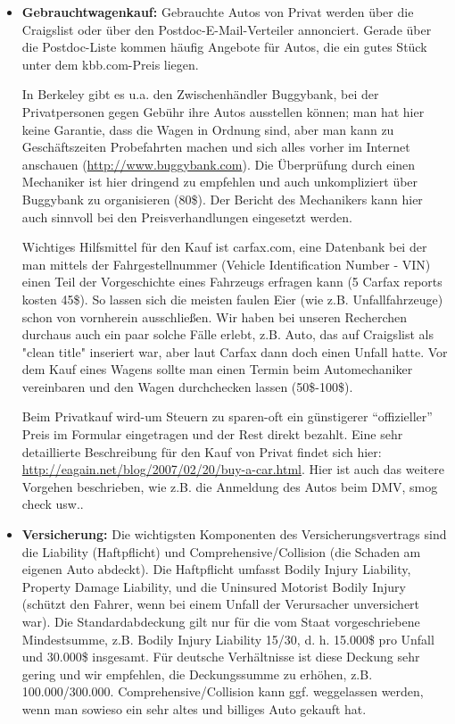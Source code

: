 \documentclass[a4paper]{scrreprt}
\begin{document}
\begin{itemize}

\item \textbf{Gebrauchtwagenkauf:} Gebrauchte Autos von Privat werden über die Craigslist oder über den Postdoc-E-Mail-Verteiler annonciert. 
Gerade über die Postdoc-Liste kommen häufig Angebote für Autos, die ein gutes Stück unter dem kbb.com-Preis liegen.

In Berkeley gibt es u.a. den Zwischenhändler Buggybank, bei der Privatpersonen gegen Gebühr ihre Autos ausstellen können; man hat hier keine Garantie, dass die Wagen in Ordnung sind, aber man kann zu Geschäftszeiten Probefahrten machen und sich alles vorher im Internet anschauen (\url{http://www.buggybank.com}). Die Überprüfung durch einen Mechaniker ist hier dringend zu empfehlen und auch unkompliziert über Buggybank zu organisieren (80\$). Der Bericht des Mechanikers kann hier auch sinnvoll bei den Preisverhandlungen eingesetzt werden.
	
Wichtiges Hilfsmittel für den Kauf ist carfax.com, eine Datenbank bei der man mittels der Fahrgestellnummer (Vehicle Identification Number - VIN) einen Teil der Vorgeschichte eines Fahrzeugs erfragen kann (5 Carfax reports kosten 45\$). So lassen sich die meisten faulen Eier (wie z.B. Unfallfahrzeuge) schon von vornherein ausschließen. Wir haben bei unseren Recherchen durchaus auch ein paar solche Fälle erlebt, z.B. Auto, das auf Craigslist als "clean title" inseriert war, aber laut Carfax dann doch einen Unfall hatte. Vor dem Kauf eines Wagens sollte man einen Termin beim Automechaniker vereinbaren und den Wagen durchchecken lassen (50\$-100\$).

Beim Privatkauf wird-um Steuern zu sparen-oft ein günstigerer "`offizieller"' Preis im Formular eingetragen und der Rest direkt bezahlt. Eine sehr detaillierte Beschreibung für den Kauf von Privat findet sich hier: \url{http://eagain.net/blog/2007/02/20/buy-a-car.html}. Hier ist auch das weitere Vorgehen beschrieben, wie z.B. die Anmeldung des Autos beim DMV, smog check usw..
	
\item \textbf{Versicherung:} Die wichtigsten Komponenten des Versicherungsvertrags sind die Liability (Haftpflicht) und Comprehensive/Collision (die Schaden am eigenen Auto abdeckt). Die Haftpflicht umfasst Bodily Injury Liability, Property Damage Liability, und die Uninsured Motorist Bodily Injury (schützt den Fahrer, wenn bei einem Unfall der Verursacher unversichert war). Die Standardabdeckung gilt nur für die vom Staat vorgeschriebene Mindestsumme, z.B. Bodily Injury Liability 15/30, d. h. 15.000\$ pro Unfall und 30.000\$ insgesamt. Für deutsche Verhältnisse ist diese Deckung sehr gering und wir empfehlen, die Deckungssumme zu erhöhen, z.B. 100.000/300.000. Comprehensive/Collision kann ggf. weggelassen werden, wenn man sowieso ein sehr altes und billiges Auto gekauft hat.


\end{itemize}
\end{document}
